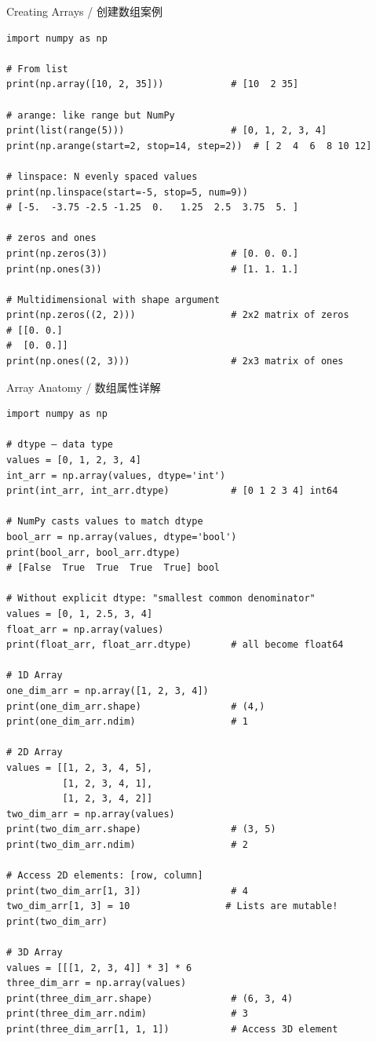 \documentclass[11pt,a4paper]{report}
\begin{document}
\begin{examplebox}{Creating Arrays / 创建数组案例}
\begin{lstlisting}
import numpy as np

# From list
print(np.array([10, 2, 35]))            # [10  2 35]

# arange: like range but NumPy
print(list(range(5)))                   # [0, 1, 2, 3, 4]
print(np.arange(start=2, stop=14, step=2))  # [ 2  4  6  8 10 12]

# linspace: N evenly spaced values
print(np.linspace(start=-5, stop=5, num=9))
# [-5.  -3.75 -2.5 -1.25  0.   1.25  2.5  3.75  5. ]

# zeros and ones
print(np.zeros(3))                      # [0. 0. 0.]
print(np.ones(3))                       # [1. 1. 1.]

# Multidimensional with shape argument
print(np.zeros((2, 2)))                 # 2x2 matrix of zeros
# [[0. 0.]
#  [0. 0.]]
print(np.ones((2, 3)))                  # 2x3 matrix of ones
\end{lstlisting}
\end{examplebox}

\begin{examplebox}{Array Anatomy / 数组属性详解}
\begin{lstlisting}
import numpy as np

# dtype — data type
values = [0, 1, 2, 3, 4]
int_arr = np.array(values, dtype='int')
print(int_arr, int_arr.dtype)           # [0 1 2 3 4] int64

# NumPy casts values to match dtype
bool_arr = np.array(values, dtype='bool')
print(bool_arr, bool_arr.dtype)
# [False  True  True  True  True] bool

# Without explicit dtype: "smallest common denominator"
values = [0, 1, 2.5, 3, 4]
float_arr = np.array(values)
print(float_arr, float_arr.dtype)       # all become float64

# 1D Array
one_dim_arr = np.array([1, 2, 3, 4])
print(one_dim_arr.shape)                # (4,)
print(one_dim_arr.ndim)                 # 1

# 2D Array
values = [[1, 2, 3, 4, 5],
          [1, 2, 3, 4, 1],
          [1, 2, 3, 4, 2]]
two_dim_arr = np.array(values)
print(two_dim_arr.shape)                # (3, 5)
print(two_dim_arr.ndim)                 # 2

# Access 2D elements: [row, column]
print(two_dim_arr[1, 3])                # 4
two_dim_arr[1, 3] = 10                 # Lists are mutable!
print(two_dim_arr)

# 3D Array
values = [[[1, 2, 3, 4]] * 3] * 6
three_dim_arr = np.array(values)
print(three_dim_arr.shape)              # (6, 3, 4)
print(three_dim_arr.ndim)               # 3
print(three_dim_arr[1, 1, 1])           # Access 3D element
\end{lstlisting}
\end{examplebox}
\end{document}
